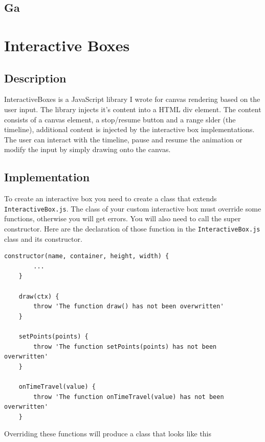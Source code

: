 \documentclass{article}
\begin{document}
\pagebreak

\subsection{Ga}

\pagebreak

\section{Interactive Boxes}

\subsection{Description}

InteractiveBoxes is a JavaScript library I wrote for canvas rendering based on the user input.
The library injects it's content into a HTML div element. The content consists of a canvas element,
a stop/resume button and a range slder (the timeline), additional content is injected by the
interactive box implementations.
The user can interact with the timeline, pause and resume the animation or modify the input by simply drawing onto the canvas.

\subsection{Implementation}

To create an interactive box you need to create a class that extends \texttt{InteractiveBox.js}.
The class of your custom interactive box must override some functions, otherwise you will get errors.
You will also need to call the super constructor.
Here are the declaration of those function in the \texttt{InteractiveBox.js} class and its constructor.

\medskip

\begin{lstlisting}[style=js]
    constructor(name, container, height, width) {
        ...
    }

    draw(ctx) {
        throw 'The function draw() has not been overwritten'
    }

    setPoints(points) {
        throw 'The function setPoints(points) has not been overwritten'
    }

    onTimeTravel(value) {
        throw 'The function onTimeTravel(value) has not been overwritten'
    }
\end{lstlisting}

Overriding these functions will produce a class that looks like this
\end{document}
